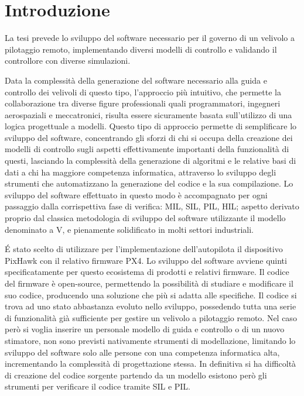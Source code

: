 \chapter{Introduzione}
La tesi prevede lo sviluppo del software necessario per il governo di un velivolo a pilotaggio remoto, implementando diversi modelli di controllo e validando il controllore con diverse simulazioni.

Data la complessità della generazione del software necessario alla guida e controllo dei velivoli di questo tipo, l'approccio più intuitivo, che permette la collaborazione tra diverse figure professionali quali programmatori, ingegneri aerospaziali e meccatronici, risulta essere sicuramente basata sull'utilizzo di una logica progettuale a modelli. Questo tipo di approccio permette di semplificare lo sviluppo del software, concentrando gli sforzi di chi si occupa della creazione dei modelli di controllo sugli aspetti effettivamente importanti della funzionalità di questi, lasciando la complessità della generazione di algoritmi e le relative basi di dati a chi ha maggiore competenza informatica, attraverso lo sviluppo degli strumenti che automatizzano la generazione del codice e la sua compilazione. 
Lo sviluppo del software effettuato in questo modo è accompagnato per ogni passaggio dalla corrispettiva fase di verifica: MIL, SIL, PIL, HIL; aspetto derivato proprio dal classica metodologia di sviluppo del software utilizzante il modello denominato a V, e pienamente solidificato in molti settori industriali.

\'E stato scelto di utilizzare per l'implementazione dell'autopilota il dispositivo PixHawk con il relativo firmware PX4. Lo sviluppo del software avviene quinti specificatamente per questo ecosistema di prodotti e relativi firmware. Il codice del firmware è open-source, permettendo la possibilità di studiare e modificare il suo codice, producendo una soluzione che più si adatta alle specifiche. Il codice si trova ad uno stato abbastanza evoluto nello sviluppo, possedendo tutta una serie di funzionalità già sufficiente per gestire un velivolo a pilotaggio remoto. Nel caso però si voglia inserire un personale modello di guida e controllo o di un nuovo stimatore, non sono previsti nativamente strumenti di modellazione, limitando lo sviluppo del software solo alle persone con una competenza informatica alta, incrementando la complessità di progettazione stessa. In definitiva si ha difficoltà di creazione del codice sorgente partendo da un modello esistono però gli strumenti per verificare il codice tramite SIL e PIL.

